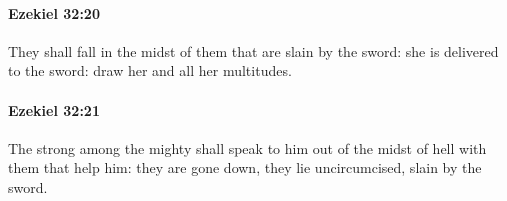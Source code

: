 		\paragraph{Ezekiel 32:20} %
			\label{EZEKIEL-32-20}

			They shall fall in the midst of them that are slain by the sword: she is delivered to the sword: draw her and all her multitudes.


		\paragraph{Ezekiel 32:21} %
			\label{EZEKIEL-32-21}

			The strong among the mighty shall speak to him out of the midst of hell with them that help him: they are gone down, they lie uncircumcised, slain by the sword.


